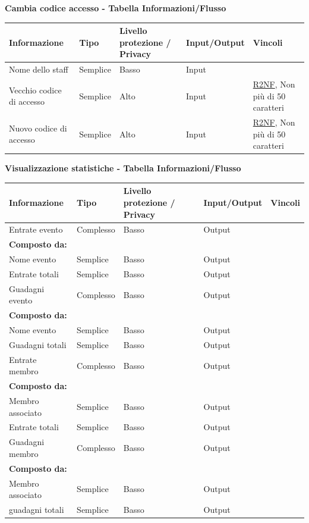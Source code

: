 \documentclass[a4paper]{article}
\begin{document}
\textbf{Cambia codice accesso  - Tabella Informazioni/Flusso}

\begin{center}
    \begin{tabularx}{1\textwidth}{|X|X|X|X|X|}
        \hline
        \textbf{Informazione} &\textbf{Tipo} & \textbf{Livello protezione / Privacy} & \textbf{Input/Output} & \textbf{Vincoli}\\
        \hline
        \hline
        Nome dello staff & Semplice & Basso & Input & \\
        \hline
        Vecchio codice di accesso & Semplice & Alto & Input & \hyperlink{R2NF}{R2NF}, Non più di 50 caratteri\\
        \hline
        Nuovo codice di accesso & Semplice & Alto & Input & \hyperlink{R2NF}{R2NF}, Non più di 50 caratteri\\
        \hline
    \end{tabularx}
\end{center}

\textbf{Visualizzazione statistiche  - Tabella Informazioni/Flusso}

\begin{center}
    \begin{tabularx}{1\textwidth}{|X|X|X|X|X|}
        \hline
        \textbf{Informazione} &\textbf{Tipo} & \textbf{Livello protezione / Privacy} & \textbf{Input/Output} & \textbf{Vincoli}\\
        \hline
        \hline
        Entrate evento & Complesso & Basso & Output & \\
        \textbf{Composto da:} & & & & \\
        Nome evento & Semplice & Basso & Output & \\
        Entrate totali & Semplice & Basso & Output & \\
        \hline
        Guadagni evento & Complesso & Basso & Output & \\
        \textbf{Composto da:} & & & & \\
        Nome evento & Semplice & Basso & Output & \\
        Guadagni totali & Semplice & Basso & Output & \\
        \hline
        Entrate membro & Complesso & Basso & Output & \\
        \textbf{Composto da:} & & & & \\
        Membro associato & Semplice & Basso & Output & \\
        Entrate totali & Semplice & Basso & Output & \\
        \hline
        Guadagni membro & Complesso & Basso & Output & \\
        \textbf{Composto da:} & & & & \\
        Membro associato & Semplice & Basso & Output & \\
        guadagni totali & Semplice & Basso & Output & \\
        \hline
    \end{tabularx}
\end{center}
\end{document}
